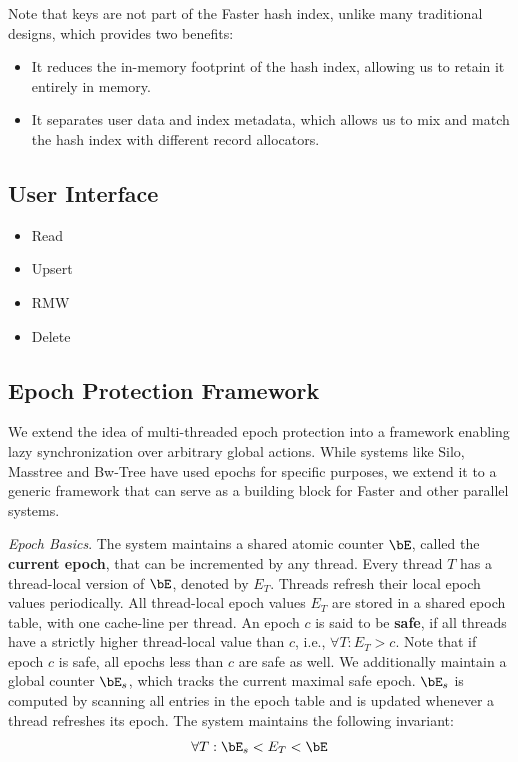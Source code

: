 \documentclass[11pt]{article}
\begin{document}
Note that keys are not part of the Faster hash index, unlike many traditional designs, which provides
two benefits:
\begin{itemize}
\item It reduces the in-memory footprint of the hash index, allowing us to retain it entirely in memory.
\item It separates user data and index metadata, which allows us to mix and match the hash index with
different record allocators.
\end{itemize}
\subsection{User Interface}
\label{sec:org1c78167}
\begin{itemize}
\item Read
\item Upsert
\item RMW
\item Delete
\end{itemize}
\subsection{Epoch Protection Framework}
\label{sec:orgc6db96f}
We extend the idea of multi-threaded epoch protection into a framework enabling lazy synchronization
over arbitrary global actions. While systems like Silo, Masstree and Bw-Tree have used epochs for
specific purposes, we extend it to a generic framework that can serve as a building block for Faster
and other parallel systems.

\emph{Epoch Basics}. The system maintains a shared atomic counter \(\bE\), called the \textbf{current epoch}, that
can be incremented by any thread. Every thread \(T\) has a thread-local version of \(\bE\), denoted by
\(E_T\). Threads refresh their local epoch values periodically. All thread-local epoch values \(E_T\)
are stored in a shared epoch table, with one cache-line per thread. An epoch \(c\) is said to be \textbf{safe},
if all threads have a strictly higher thread-local value than \(c\), i.e., \(\forall T:E_T>c\). Note
that if epoch \(c\) is safe, all epochs less than \(c\) are safe as well. We additionally maintain a
global counter \(\bE_s\), which tracks the current maximal safe epoch. \(\bE_s\) is computed by
scanning all entries in the epoch table and is updated whenever a thread refreshes its epoch. The
system maintains the following invariant:
\begin{equation*}
\forall T:\bE_s<E_T<\bE
\end{equation*}
\end{document}
